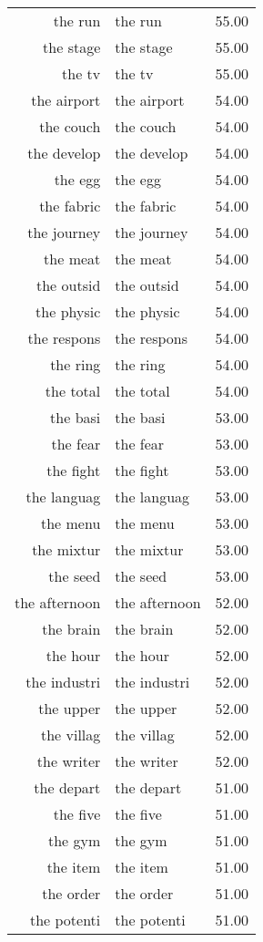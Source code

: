 \begin{table}[ht]
\begin{tabular}{rlr}
  the run & the run & 55.00 \\ 
  the stage & the stage & 55.00 \\ 
  the tv & the tv & 55.00 \\ 
  the airport & the airport & 54.00 \\ 
  the couch & the couch & 54.00 \\ 
  the develop & the develop & 54.00 \\ 
  the egg & the egg & 54.00 \\ 
  the fabric & the fabric & 54.00 \\ 
  the journey & the journey & 54.00 \\ 
  the meat & the meat & 54.00 \\ 
  the outsid & the outsid & 54.00 \\ 
  the physic & the physic & 54.00 \\ 
  the respons & the respons & 54.00 \\ 
  the ring & the ring & 54.00 \\ 
  the total & the total & 54.00 \\ 
  the basi & the basi & 53.00 \\ 
  the fear & the fear & 53.00 \\ 
  the fight & the fight & 53.00 \\ 
  the languag & the languag & 53.00 \\ 
  the menu & the menu & 53.00 \\ 
  the mixtur & the mixtur & 53.00 \\ 
  the seed & the seed & 53.00 \\ 
  the afternoon & the afternoon & 52.00 \\ 
  the brain & the brain & 52.00 \\ 
  the hour & the hour & 52.00 \\ 
  the industri & the industri & 52.00 \\ 
  the upper & the upper & 52.00 \\ 
  the villag & the villag & 52.00 \\ 
  the writer & the writer & 52.00 \\ 
  the depart & the depart & 51.00 \\ 
  the five & the five & 51.00 \\ 
  the gym & the gym & 51.00 \\ 
  the item & the item & 51.00 \\ 
  the order & the order & 51.00 \\ 
  the potenti & the potenti & 51.00 \\ 

\end{tabular}
\end{table}
